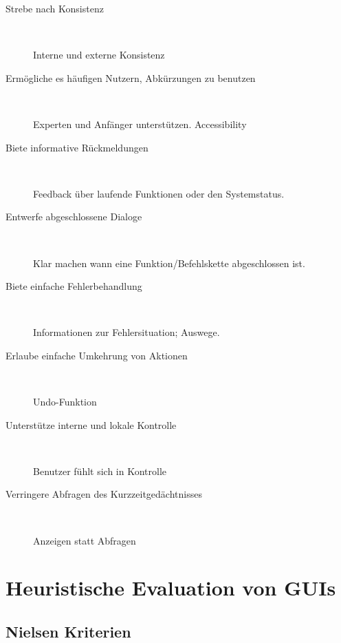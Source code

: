 \documentclass{report}
\begin{document}
\begin{description}
\item[Strebe nach Konsistenz]~\par
Interne und externe Konsistenz
\item[Ermögliche es häufigen Nutzern, Abkürzungen zu benutzen]~\par
Experten und Anfänger unterstützen. Accessibility
\item[Biete informative Rückmeldungen]~\par
Feedback über laufende Funktionen oder den Systemstatus.
\item[Entwerfe abgeschlossene Dialoge]~\par
Klar machen wann eine Funktion/Befehlskette abgeschlossen ist.
\item[Biete einfache Fehlerbehandlung]~\par
Informationen zur Fehlersituation; Auswege.
\item[Erlaube einfache Umkehrung von Aktionen]~\par
Undo-Funktion
\item[Unterstütze interne und lokale Kontrolle]~\par
Benutzer fühlt sich in Kontrolle
\item[Verringere Abfragen des Kurzzeitgedächtnisses]~\par
Anzeigen statt Abfragen

\end{description}

\newpage

\section*{Heuristische Evaluation von GUIs}
\subsection*{Nielsen Kriterien}
\end{document}
